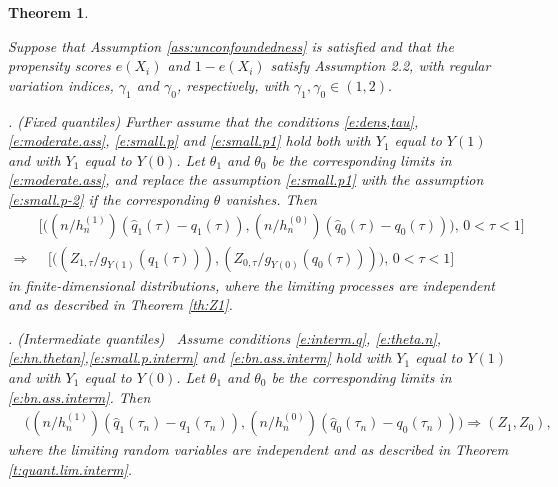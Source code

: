 \documentclass[12pt]{amsart}
\newcommand{\1}{\mathbbm{1}}
\newcommand{\0}{\mathbf{0}}
\theoremstyle{plain}
\newtheorem{theorem}{Theorem}[section]
\theoremstyle{definition}
\begin{document}
\begin{theorem}\label{thm:joint}

Suppose that  Assumption  \ref{ass:unconfoundedness} is satisfied and that the propensity scores $e(X_i)$ and $1-e(X_i)$ satisfy Assumption 2.2, with regular variation indices, $\gamma_1$ and $\gamma_0$, respectively,  with $\gamma_1,\gamma_0\in (1,2).$  
 
   \smallskip 
    . (Fixed quantiles) Further assume that the conditions   
\eqref{e:dens,tau}, \eqref{e:moderate.ass}, \eqref{e:small.p}
 and 
 \eqref{e:small.p1}    
 hold both with $Y_1$ equal to $Y(1)$ and with $Y_1$ equal to $Y(0)$. Let $\theta_1$
and $\theta_0$ be the corresponding limits in \eqref{e:moderate.ass}, and replace the assumption \eqref{e:small.p1} with the assumption 
 \eqref{e:small.p-2} if the corresponding $\theta$
vanishes.  Then
\begin{align*}
 &\bigl[\bigl((n/h_n^{(1)})( \hat q_1(\tau) -q_1(\tau)),(n/h_n^{(0)})( \hat q_0(\tau) -q_0(\tau))\bigr), \, 0<\tau<1\bigr] \\
 \Rightarrow&  
 ~~~ \bigl[\bigl((Z_{1,\tau}/g_{Y(1)}(q_1(\tau))),    
  (Z_{0,\tau}/g_{Y(0)}(q_0(\tau)))\bigr), \, 0<\tau<1\bigr]   
  \end{align*}
in finite-dimensional distributions, 
where the limiting processes are independent and as described in Theorem \ref{th:Z1}. 

\smallskip 
    . (Intermediate quantiles) \ Assume conditions  \eqref{e:interm.q}, \eqref{e:theta.n}, \eqref{e:hn.thetan},\eqref{e:small.p.interm} and 
\eqref{e:bn.ass.interm} hold with $Y_1$ equal to $Y(1)$ and with $Y_1$ equal to $Y(0)$. 
Let $\theta_1$
and $\theta_0$ be the corresponding limits in \eqref{e:bn.ass.interm}. 
Then 
\begin{align*}
 &\bigl((n/h_n^{(1)})( \hat q_1(\tau_n) -q_1(\tau_n)),(n/h_n^{(0)})( \hat q_0(\tau_n) -q_0(\tau_n))\bigr) 
 \Rightarrow (Z_1,Z_0),
  \end{align*}
  where the limiting random variables are independent and as described in Theorem \ref{t:quant.lim.interm}. 
\end{theorem}
\end{document}
